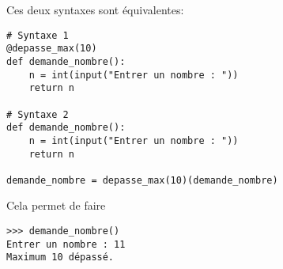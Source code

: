 Ces deux syntaxes sont équivalentes:

\begin{verbatim}
# Syntaxe 1
@depasse_max(10)
def demande_nombre():
    n = int(input("Entrer un nombre : "))
    return n

# Syntaxe 2
def demande_nombre():
    n = int(input("Entrer un nombre : "))
    return n

demande_nombre = depasse_max(10)(demande_nombre)
\end{verbatim}

Cela permet de faire

\begin{verbatim}
>>> demande_nombre()
Entrer un nombre : 11
Maximum 10 dépassé.
\end{verbatim}
